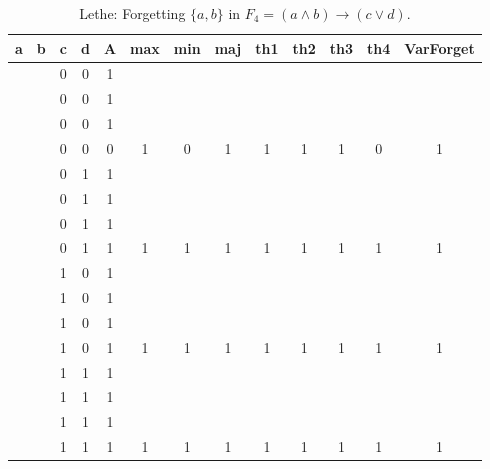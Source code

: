 \begin{table}[!tb]
    \centering
    \begin{tabular}{|c|c|c|c|c|c|c|c|c|c|c|c|c|}
        \hline
        \textbf{a} & \textbf{b} & \textbf{c} & \textbf{d} & \textbf{A} & \textbf{max} & \textbf{min} & \textbf{maj} & \textbf{th1} & \textbf{th2} & \textbf{th3} & \textbf{th4} & \textbf{VarForget} \\ \hline
        \rowcolor{gray!40}  &  & 0 & 0 & 1 &  &  &  &  &  &  &  &  \\ \hline
        \rowcolor{gray!40}  &  & 0 & 0 & 1 &  &  &  &  &  &  &  &  \\ \hline
        \rowcolor{gray!40}  &  & 0 & 0 & 1 &  &  &  &  &  &  &  &  \\ \hline
        \rowcolor{gray!40}  &  & 0 & 0 & 0 & 1 & 0 & 1 & 1 & 1 & 1 & 0 & 1 \\ \hline
        \rowcolor{blue!40}  &  & 0 & 1 & 1 &  &  &  &  &  &  &  &  \\ \hline
        \rowcolor{blue!40}  &  & 0 & 1 & 1 &  &  &  &  &  &  &  &  \\ \hline
        \rowcolor{blue!40}  &  & 0 & 1 & 1 &  &  &  &  &  &  &  &  \\ \hline
        \rowcolor{blue!40}  &  & 0 & 1 & 1 & 1 & 1 & 1 & 1 & 1 & 1 & 1 & 1 \\ \hline
        \rowcolor{red!40}  &  & 1 & 0 & 1 &  &  &  &  &  &  &  &  \\ \hline
        \rowcolor{red!40}  &  & 1 & 0 & 1 &  &  &  &  &  &  &  &  \\ \hline
        \rowcolor{red!40}  &  & 1 & 0 & 1 &  &  &  &  &  &  &  &  \\ \hline
        \rowcolor{red!40}  &  & 1 & 0 & 1 & 1 & 1 & 1 & 1 & 1 & 1 & 1 & 1 \\ \hline
        \rowcolor{green!40}  &  & 1 & 1 & 1 &  &  &  &  &  &  &  &  \\ \hline
        \rowcolor{green!40}  &  & 1 & 1 & 1 &  &  &  &  &  &  &  &  \\ \hline
        \rowcolor{green!40}  &  & 1 & 1 & 1 &  &  &  &  &  &  &  &  \\ \hline
        \rowcolor{green!40}  &  & 1 & 1 & 1 & 1 & 1 & 1 & 1 & 1 & 1 & 1 & 1 \\ \hline
    \end{tabular}
    \caption{Lethe: Forgetting $\{a, b\}$ in $F_{4} = (a \land b) \rightarrow (c \lor d)$.}
    \label{tab:lethe-F4-ab}
\end{table}
